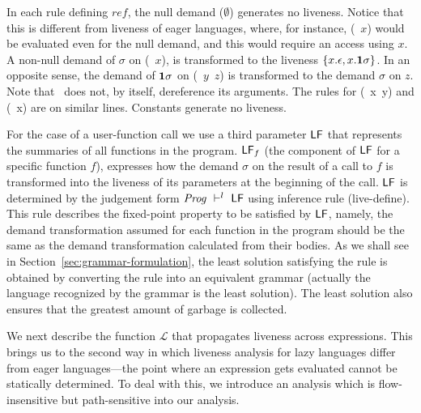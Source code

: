 \documentclass[9pt]{sigplanconf}
\newcommand{\comment}[1]{{\color{Myblue}{(#1)}}}
\begin{document}
 In each  rule defining $\mathit{ref}$, the  null demand ($\emptyset$)
 generates no  liveness.  Notice that this is  different from liveness
 of  eager  languages,  where,   for  instance,  (\CDR~$x$)  would  be
 evaluated even for the null  demand, and this would require an access
 using  $x$.   A  non-null   demand  of  $\sigma$  on  (\CDR~$x$),  is
 transformed  to  the  liveness  $\{x.\epsilon, x.\mathbf{1}\sigma\}$.   In  an
 opposite  sense, the  demand of  $\mathbf{1}\sigma$ on  (\CONS~$y$~$z$) is
 transformed to  the demand  $\sigma$ on $z$.   Note that  \CONS\ does
 not, by itself, dereference  its arguments. The rules for (\PRIM~x~y)
 and (\NULLQ~x) are on similar lines. Constants generate no liveness.


For  the  case  of a  user-function  call  we  use a  third  parameter
$\mathsf{LF}$  that  represents the  summaries  of  all  functions in  the
program.  $\mathsf{LF}_f$  (the  component  of $\mathsf{LF}$  for  a  specific
function $f$),  expresses how the demand  $\sigma$ on the  result of a
call to $f$ is transformed into  the liveness of its parameters at the
beginning of the call.  $\mathsf{LF}$  is determined by the judgement form
$\mathit{Prog} \ \vdash^l\  \mathsf{LF}$ using inference rule ({\sc live-define}).
This  rule  describes the  fixed-point  property  to  be satisfied  by
$\mathsf{LF}$, namely, the demand transformation assumed for each function
in  the  program should  be  the  same  as the  demand  transformation
calculated    from   their    bodies.     As   we    shall   see    in
Section~\ref{sec:grammar-formulation},  the least  solution satisfying
the  rule  is obtained  by  converting  the  rule into  an  equivalent
grammar (actually the language recognized by the grammar is the least solution).  The least solution also  ensures that the greatest amount of
garbage is collected.
  



We next  describe the function $\mathcal{L}$  that propagates liveness
across  expressions.   This brings  us  to  the  second way  in  which
liveness analysis for lazy languages differ from eager languages---the
point  where  an  expression   gets  evaluated  cannot  be  statically
determined.  To  deal with this, we introduce an analysis which is
flow-insensitive but path-sensitive\comment{Checked the terminology, path-sensitive means certain prooperties holding along a path only, http://en.wikipedia.org/wiki/Data-flow\_analysis} into
our  analysis.  
\end{document}
